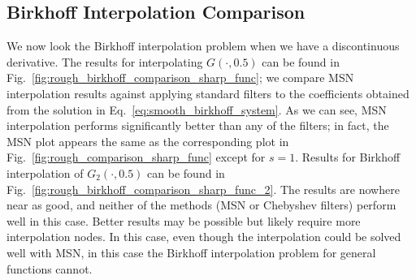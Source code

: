 










\subsection{Birkhoff Interpolation Comparison}

We now look the Birkhoff interpolation problem when we have
a discontinuous derivative.
The results for interpolating $G(\cdot,0.5)$ can be found in 
Fig.~\ref{fig:rough_birkhoff_comparison_sharp_func};
we compare MSN interpolation results against applying standard
filters to the coefficients obtained from the solution
in Eq.~\eqref{eq:smooth_birkhoff_system}.
As we can see, MSN interpolation performs significantly better than
any of the filters; in fact, the MSN plot appears the same as
the corresponding plot in Fig.~\ref{fig:rough_comparison_sharp_func}
except for $s=1$.
Results for Birkhoff interpolation of $G_{2}(\cdot,0.5)$
can be found in Fig.~\ref{fig:rough_birkhoff_comparison_sharp_func_2}.
The results are nowhere near as good, and neither of the methods
(MSN or Chebyshev filters) perform well in this case.
Better results may be possible but likely require more
interpolation nodes.
In this case, even though the interpolation could be solved well
with MSN, in this case the Birkhoff interpolation problem 
for general functions cannot.



